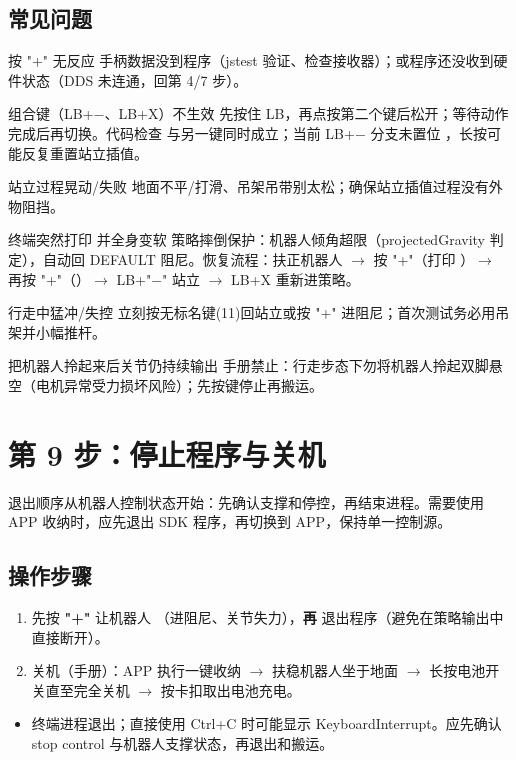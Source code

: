 \subsection*{常见问题}
\begin{faq}{按 "+" 无反应}
手柄数据没到程序（jstest 验证、检查接收器）；或程序还没收到硬件状态（DDS 未连通，回第 4/7 步）。
\end{faq}
\begin{faq}{组合键（LB+−、LB+X）不生效}
先按住 LB，再点按第二个键后松开；等待动作完成后再切换。代码检查  与另一键同时成立；当前 LB+− 分支未置位 ，长按可能反复重置站立插值。
\end{faq}
\begin{faq}{站立过程晃动/失败}
地面不平/打滑、吊架吊带别太松；确保站立插值过程没有外物阻挡。
\end{faq}
\begin{faq}{终端突然打印  并全身变软}
策略摔倒保护：机器人倾角超限（projectedGravity 判定），自动回 DEFAULT 阻尼。恢复流程：扶正机器人 $\rightarrow$ 按 "+"（打印 ）$\rightarrow$ 再按 "+"（）$\rightarrow$ LB+"−" 站立 $\rightarrow$ LB+X 重新进策略。
\end{faq}
\begin{faq}{行走中猛冲/失控}
立刻按无标名键(11)回站立或按 "+" 进阻尼；首次测试务必用吊架并小幅推杆。
\end{faq}
\begin{faq}{把机器人拎起来后关节仍持续输出}
手册禁止：行走步态下勿将机器人拎起双脚悬空（电机异常受力损坏风险）；先按键停止再搬运。
\end{faq}


\section{第 9 步：停止程序与关机}
\label{step:9}
退出顺序从机器人控制状态开始：先确认支撑和停控，再结束进程。需要使用 APP 收纳时，应先退出 SDK 程序，再切换到 APP，保持单一控制源。


\subsection*{操作步骤}
\begin{enumerate}
\item 先按 \textbf{"+"} 让机器人 （进阻尼、关节失力），\textbf{再}  退出程序（避免在策略输出中直接断开）。
\item 关机（手册）：APP 执行一键收纳 $\rightarrow$ 扶稳机器人坐于地面 $\rightarrow$ 长按电池开关直至完全关机 $\rightarrow$ 按卡扣取出电池充电。

\end{enumerate}
\begin{expected}
\begin{itemize}
\item 终端进程退出；直接使用 Ctrl+C 时可能显示 KeyboardInterrupt。应先确认 stop control 与机器人支撑状态，再退出和搬运。

\end{itemize}
\end{expected}
